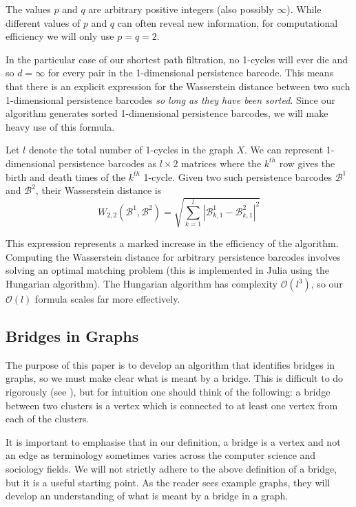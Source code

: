 \documentclass[12pt,a4paper]{amsart}
\numberwithin{equation}{section}
\theoremstyle{plain}
\theoremstyle{definition}
\begin{document}
The values $p$ and $q$ are arbitrary positive integers (also possibly $\infty$). While different values of $p$ and $q$ can often reveal new information, for computational efficiency we will only use $p=q=2$.

In the particular case of our shortest path filtration, no 1-cycles will ever die and so $d=\infty$ for every pair in the 1-dimensional persistence barcode. This means that there is an explicit expression for the Wasserstein distance between two such 1-dimensional persistence barcodes \textit{so long as they have been sorted}. Since our algorithm generates sorted 1-dimensional persistence barcodes, we will make heavy use of this formula. 

Let $l$ denote the total number of 1-cycles in the graph $X$. We can represent 1-dimensional persistence barcodes as $l \times 2$ matrices where the $k^{th}$ row gives the birth and death times of the $k^{th}$ 1-cycle. Given two such persistence barcodes $\mathcal{B}^1$ and $\mathcal{B}^2$, their Wasserstein distance is
\[ W_{2,2}(\mathcal{B}^1, \mathcal{B}^2) = \sqrt{\sum_{k=1}^l |\mathcal{B}^1_{k, 1} - \mathcal{B}^2_{k,1} |^2} \]

This expression represents a marked increase in the efficiency of the algorithm. Computing the Wasserstein distance for arbitrary persistence barcodes involves solving an optimal matching problem (this is implemented in Julia using the Hungarian algorithm). The Hungarian algorithm has complexity $\mathcal{O}(l^3)$, so our $\mathcal{O}(l)$ formula scales far more effectively.


\subsection*{Bridges in Graphs}

The purpose of this paper is to develop an algorithm that identifies bridges in graphs, so we must make clear what is meant by a bridge. This is difficult to do rigorously (see \cite{bridgeDef}), but for intuition one should think of the following: a bridge between two clusters is a vertex which is connected to at least one vertex from each of the clusters.

It is important to emphasise that in our definition, a bridge is a vertex and not an edge as terminology sometimes varies across the computer science and sociology fields. We will not strictly adhere to the above definition of a bridge, but it is a useful starting point. As the reader sees example graphs, they will develop an understanding of what is meant by a bridge in a graph.
\end{document}
